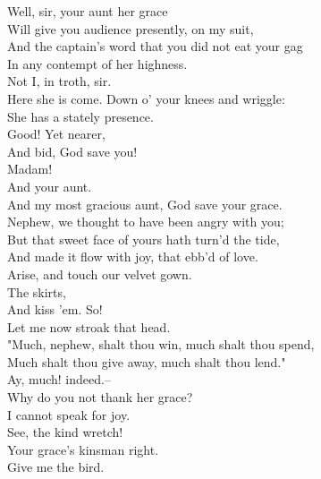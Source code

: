 \documentclass{memoir}
\begin{document}
\begin{drama*}
\subtlespeaks {} Well, sir, your aunt her grace\\
 Will give you audience presently, on my suit,\\
 And the captain's word that you did not eat your gag\\
 In any contempt of her highness.\\
\dapperspeaks {} Not I, in troth, sir.\\
\subtlespeaks  Here she is come. Down o' your knees and wriggle:\\
 She has a stately presence.\\
 Good! Yet nearer,\\
 And bid, God save you!\\
\dapperspeaks {} Madam!\\
\subtlespeaks {} And your aunt.\\
\dapperspeaks  And my most gracious aunt, God save your grace.\\
\dolspeaks  Nephew, we thought to have been angry with you;\\
 But that sweet face of yours hath turn'd the tide,\\
 And made it flow with joy, that ebb'd of love.\\
 Arise, and touch our velvet gown.\\
\subtlespeaks {} The skirts,\\
 And kiss 'em. So!\\
\dolspeaks {} Let me now stroak that head.\\
 "Much, nephew, shalt thou win, much shalt thou spend,\\
 Much shalt thou give away, much shalt thou lend."\\
\subtlespeaks {} Ay, much! indeed.--\\
 Why do you not thank her grace?\\
\dapperspeaks {} I cannot speak for joy.\\
\subtlespeaks  See, the kind wretch!\\
 Your grace's kinsman right.\\
\dolspeaks {} Give me the bird.\\

\end{drama*}
\end{document}
